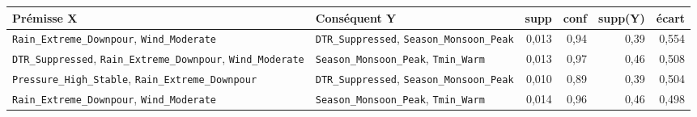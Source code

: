 \footnotesize
\begin{tabular}{>{\raggedright\arraybackslash}p{4.7cm}>{\raggedright\arraybackslash}p{4.4cm}rrrr}
\toprule
\rowcolor{NuitBleue!90}
\color{white}\textbf{Prémisse X} & \color{white}\textbf{Conséquent Y} & \color{white}\textbf{supp} & \color{white}\textbf{conf} & \color{white}\textbf{supp(Y)} & \color{white}\textbf{écart} \\
\midrule
\texttt{Rain\_Extreme\_Downpour}, \texttt{Wind\_Moderate} & \texttt{DTR\_Suppressed}, \texttt{Season\_Monsoon\_Peak} & 0,013 & 0,94 & 0,39 & 0,554 \\
\texttt{DTR\_Suppressed}, \texttt{Rain\_Extreme\_Downpour}, \texttt{Wind\_Moderate} & \texttt{Season\_Monsoon\_Peak}, \texttt{Tmin\_Warm} & 0,013 & 0,97 & 0,46 & 0,508 \\
\texttt{Pressure\_High\_Stable}, \texttt{Rain\_Extreme\_Downpour} & \texttt{DTR\_Suppressed}, \texttt{Season\_Monsoon\_Peak} & 0,010 & 0,89 & 0,39 & 0,504 \\
\texttt{Rain\_Extreme\_Downpour}, \texttt{Wind\_Moderate} & \texttt{Season\_Monsoon\_Peak}, \texttt{Tmin\_Warm} & 0,014 & 0,96 & 0,46 & 0,498 \\
\bottomrule
\end{tabular}
